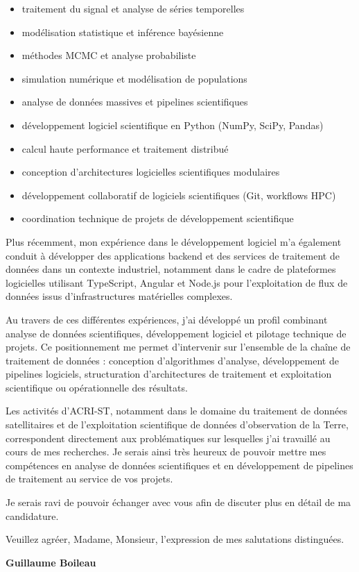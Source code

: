 \documentclass[11pt,a4paper]{altacv}
\begin{document}
{\begin{itemize}
\item traitement du signal et analyse de séries temporelles
\item modélisation statistique et inférence bayésienne
\item méthodes MCMC et analyse probabiliste
\item simulation numérique et modélisation de populations
\item analyse de données massives et pipelines scientifiques
\item développement logiciel scientifique en Python (NumPy, SciPy, Pandas)
\item calcul haute performance et traitement distribué
\item conception d'architectures logicielles scientifiques modulaires
\item développement collaboratif de logiciels scientifiques (Git, workflows HPC)
\item coordination technique de projets de développement scientifique
\end{itemize}

Plus récemment, mon expérience dans le développement logiciel m'a également conduit à développer des applications backend et des services de traitement de données dans un contexte industriel, notamment dans le cadre de plateformes logicielles utilisant TypeScript, Angular et Node.js pour l'exploitation de flux de données issus d'infrastructures matérielles complexes.

Au travers de ces différentes expériences, j'ai développé un profil combinant analyse de données scientifiques, développement logiciel et pilotage technique de projets. Ce positionnement me permet d'intervenir sur l'ensemble de la chaîne de traitement de données : conception d'algorithmes d'analyse, développement de pipelines logiciels, structuration d'architectures de traitement et exploitation scientifique ou opérationnelle des résultats.

Les activités d'ACRI-ST, notamment dans le domaine du traitement de données satellitaires et de l'exploitation scientifique de données d'observation de la Terre, correspondent directement aux problématiques sur lesquelles j'ai travaillé au cours de mes recherches. Je serais ainsi très heureux de pouvoir mettre mes compétences en analyse de données scientifiques et en développement de pipelines de traitement au service de vos projets.

Je serais ravi de pouvoir échanger avec vous afin de discuter plus en détail de ma candidature.

Veuillez agréer, Madame, Monsieur, l'expression de mes salutations distinguées.

\textbf{Guillaume Boileau}

}
\end{document}
